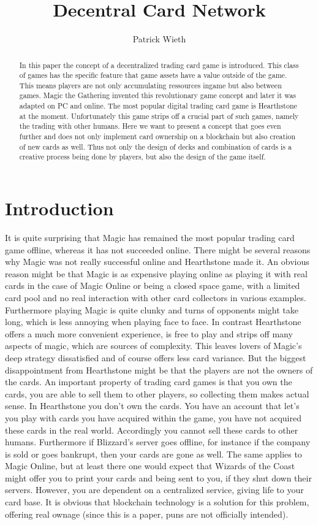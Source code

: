 \documentclass{article}
\title{Decentral Card Network}
\author{Patrick Wieth}
\begin{document}
\maketitle
%
\begin{abstract}
In this paper the concept of a decentralized trading card game is introduced. This class of games has the specific feature that game assets have a value outside of the game. This means players are not only accumulating ressources ingame but also between games. Magic the Gathering\cite{mtg} invented this revolutionary game concept and later it was adapted on PC and online. The most popular digital trading card game is Hearthstone\cite{hearthstone} at the moment. Unfortunately this game strips off a crucial part of such games, namely the trading with other humans. Here we want to present a concept that goes even further and does not only implement card ownership on a blockchain but also creation of new cards as well. Thus not only the design of decks and combination of cards is a creative process being done by players, but also the design of the game itself. 
\end{abstract}
%
\section{Introduction}
%
It is quite surprising that Magic has remained the most popular trading card game offline, whereas it has not succeeded online. There might be several reasons why Magic was not really successful online and Hearthstone made it. An obvious reason might be that Magic is as expensive playing online as playing it with real cards in the case of Magic Online or being a closed space game, with a limited card pool and no real interaction with other card collectors in various examples. Furthermore playing Magic is quite clunky and turns of opponents might take long, which is less annoying when playing face to face. In contrast Hearthstone offers a much more convenient experience, is free to play and strips off many aspects of magic, which are sources of complexity. This leaves lovers of Magic's deep strategy dissatisfied and of course offers less card variance. But the biggest disappointment from Hearthstone might be that the players are not the owners of the cards. An important property of trading card games is that you own the cards, you are able to sell them to other players, so collecting them makes actual sense. In Hearthstone you don't own the cards. You have an account that let's you play with cards you have acquired within the game, you have not acquired these cards in the real world. Accordingly you cannot sell these cards to other humans. Furthermore if Blizzard's server goes offline, for instance if the company is sold or goes bankrupt, then your cards are gone as well. The same applies to Magic Online, but at least there one would expect that Wizards of the Coast might offer you to print your cards and being sent to you, if they shut down their servers. However, you are dependent on a centralized service, giving life to your card base. It is obvious that blockchain technology is a solution for this problem, offering real ownage (since this is a paper, puns are not officially intended). 
%
\end{document}
